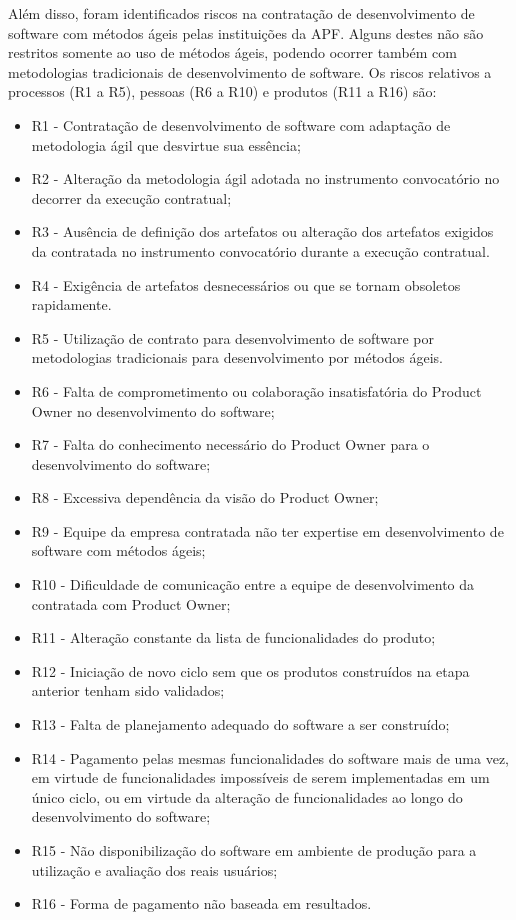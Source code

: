 Além disso, foram identificados riscos na contratação de desenvolvimento de software com métodos ágeis pelas instituições da APF. Alguns destes não são restritos somente ao uso
de métodos ágeis, podendo ocorrer também com metodologias tradicionais de desenvolvimento de software. Os riscos relativos a processos (R1 a R5), pessoas (R6 a R10) e produtos (R11 a R16) são:
\begin{itemize}
\item R1 - Contratação de desenvolvimento de software com adaptação de metodologia ágil que desvirtue sua essência;
\item R2 - Alteração da metodologia ágil adotada no instrumento convocatório no decorrer da execução contratual;
\item R3 - Ausência de definição dos artefatos ou alteração dos artefatos exigidos da contratada no instrumento convocatório durante a execução contratual.
\item R4 - Exigência de artefatos desnecessários ou que se tornam obsoletos rapidamente.
\item R5 - Utilização de contrato para desenvolvimento de software por metodologias tradicionais para desenvolvimento por métodos ágeis.
\item R6 - Falta de comprometimento ou colaboração insatisfatória do Product Owner no desenvolvimento do software;
\item R7 - Falta do conhecimento necessário do Product Owner para o desenvolvimento do software;
\item R8 - Excessiva dependência da visão do Product Owner;
\item R9 - Equipe da empresa contratada não ter expertise em desenvolvimento de software com métodos ágeis;
\item R10 - Dificuldade de comunicação entre a equipe de desenvolvimento da contratada com Product Owner;
\item R11 - Alteração constante da lista de funcionalidades do produto;
\item R12 - Iniciação de novo ciclo sem que os produtos construídos na etapa anterior tenham sido validados;
\item R13 - Falta de planejamento adequado do software a ser construído;
\item R14 - Pagamento pelas mesmas funcionalidades do software mais de uma vez, em virtude de funcionalidades impossíveis de serem implementadas em um único ciclo, ou em virtude da
alteração de funcionalidades ao longo do desenvolvimento do software;
\item R15 - Não disponibilização do software em ambiente de produção para a utilização e avaliação dos reais usuários;
\item R16 - Forma de pagamento não baseada em resultados.
\end{itemize}

